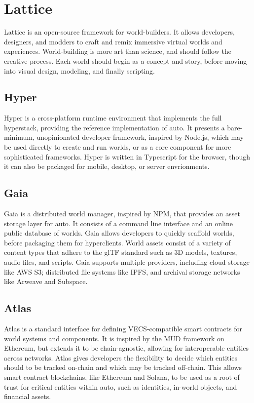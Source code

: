 \documentclass[twocolumn, 10pt]{article}
\begin{document}
\section{Lattice}
Lattice is an open-source framework for world-builders. It allows developers, designers, and modders to craft and remix immersive virtual worlds and experiences. World-building is more art than science, and should follow the creative process. Each world should begin as a concept and story, before moving into visual design, modeling, and finally scripting.

\subsection{Hyper}
Hyper is a cross-platform runtime environment that implements the full hyperstack, providing the reference implementation of auto. It presents a bare-minimum, unopinionated developer framework, inspired by Node.js, which may be used directly to create and run worlds, or as a core component for more sophisticated frameworks. Hyper is written in Typescript for the browser, though it can also be packaged for mobile, desktop, or server envrionments.

\subsection{Gaia}
Gaia is a distributed world manager, inspired by NPM, that provides an asset storage layer for auto. It consists of a command line interface and an online public database of worlds. Gaia allows developers to quickly scaffold worlds, before packaging them for hyperclients. World assets consist of a variety of content types that adhere to the glTF standard such as 3D models, textures, audio files, and scripts. Gaia supports multiple providers, including cloud storage like AWS S3; distributed file systems like IPFS, and archival storage networks like Arweave and Subspace.

\subsection{Atlas}
Atlas is a standard interface for defining VECS-compatible smart contracts for world systems and components. It is inspired by the MUD framework on Ethereum, but extends it to be chain-agnostic, allowing for interoperable entities across networks. Atlas gives developers the flexibility to decide which entities should to be tracked on-chain and which may be tracked off-chain. This allows smart contract blockchains, like Ethereum and Solana, to be used as a root of trust for critical entities within auto, such as identities, in-world objects, and financial assets.
\end{document}
